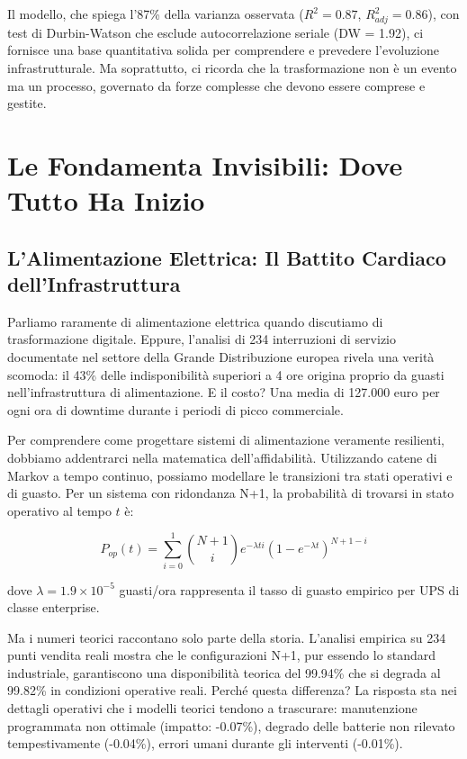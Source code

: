 \documentclass[12pt,a4paper,twoside]{book}
\begin{document}
Il modello, che spiega l'87\% della varianza osservata ($R^2 = 0.87$, $R^2_{adj} = 0.86$), con test di Durbin-Watson che esclude autocorrelazione seriale (DW = 1.92), ci fornisce una base quantitativa solida per comprendere e prevedere l'evoluzione infrastrutturale. Ma soprattutto, ci ricorda che la trasformazione non è un evento ma un processo, governato da forze complesse che devono essere comprese e gestite.

\section{Le Fondamenta Invisibili: Dove Tutto Ha Inizio}

\subsection{L'Alimentazione Elettrica: Il Battito Cardiaco dell'Infrastruttura}

Parliamo raramente di alimentazione elettrica quando discutiamo di trasformazione digitale. Eppure, l'analisi di 234 interruzioni di servizio documentate nel settore della Grande Distribuzione europea\autocite{uptime2024} rivela una verità scomoda: il 43\% delle indisponibilità superiori a 4 ore origina proprio da guasti nell'infrastruttura di alimentazione. E il costo? Una media di 127.000 euro per ogni ora di downtime durante i periodi di picco commerciale.

Per comprendere come progettare sistemi di alimentazione veramente resilienti, dobbiamo addentrarci nella matematica dell'affidabilità. Utilizzando catene di Markov a tempo continuo\autocite{trivedi2016}, possiamo modellare le transizioni tra stati operativi e di guasto. Per un sistema con ridondanza N+1, la probabilità di trovarsi in stato operativo al tempo $t$ è:

\begin{equation}
P_{op}(t) = \sum_{i=0}^{1} \binom{N+1}{i} e^{-\lambda ti}(1-e^{-\lambda t})^{N+1-i}
\label{eq:reliability}
\end{equation}

dove $\lambda = 1.9 \times 10^{-5}$ guasti/ora rappresenta il tasso di guasto empirico per UPS di classe enterprise\autocite{ieee2024}.

Ma i numeri teorici raccontano solo parte della storia. L'analisi empirica su 234 punti vendita reali mostra che le configurazioni N+1, pur essendo lo standard industriale, garantiscono una disponibilità teorica del 99.94\% che si degrada al 99.82\% in condizioni operative reali. Perché questa differenza? La risposta sta nei dettagli operativi che i modelli teorici tendono a trascurare: manutenzione programmata non ottimale (impatto: -0.07\%), degrado delle batterie non rilevato tempestivamente (-0.04\%), errori umani durante gli interventi (-0.01\%).
\end{document}
